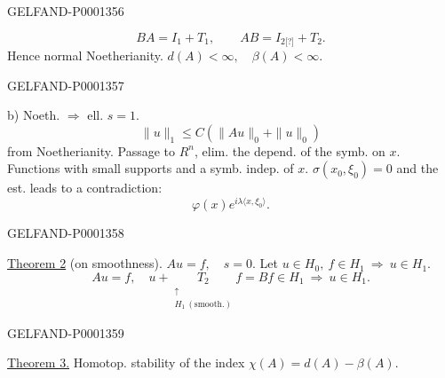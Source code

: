 \begin{GelfandAdjacentEvidence}{GELFAND-P000135}{6}

\begin{equation*}
BA=I_1+T_1,\qquad AB=I_{2\text{[?]}}+T_2.
\end{equation*}
Hence normal Noetherianity. $d (A)<\infty,\quad\beta (A)<\infty$.
\end{GelfandAdjacentEvidence}
\begin{GelfandAdjacentEvidence}{GELFAND-P000135}{7}


b) Noeth. $\Rightarrow$ ell. $s=1$.
\begin{equation*}
\|u\|_1\le C (\|Au\|_0+\|u\|_0)
\end{equation*}
from Noetherianity. Passage to $R^n$, elim. the depend. of the symb. on $x$. Functions with small supports and a symb. indep. of $x$. $\sigma (x_0,\xi_0)=0$ and the est. leads to a contradiction:
\begin{equation*}
\varphi (x)e^{i\lambda\langle x,\xi_0\rangle}.
\end{equation*}
\end{GelfandAdjacentEvidence}
\begin{GelfandAdjacentEvidence}{GELFAND-P000135}{8}


\underline{Theorem 2} (on smoothness). $Au=f,\quad s=0$.
Let $u\in H_0,\ f\in H_1\ \Rightarrow\ u\in H_1$.
\begin{equation*}
Au=f,\quad u+\underset{\substack{\uparrow\\H_1\,(\text{smooth.})}}{T_2}f=Bf\in H_1\ \Rightarrow\ u\in H_1.
\end{equation*}
\end{GelfandAdjacentEvidence}
\begin{GelfandAdjacentEvidence}{GELFAND-P000135}{9}


\underline{Theorem 3.} Homotop. stability of the index $\chi (A)=d (A)-\beta (A)$.
\end{GelfandAdjacentEvidence}



